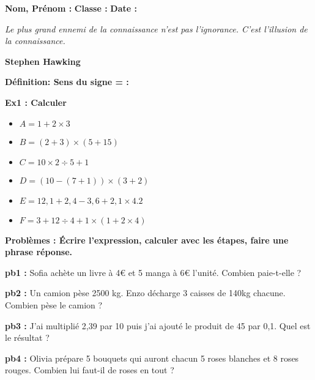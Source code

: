 



\textbf{Nom, Prénom :} \hspace{8cm} \textbf{Classe :} \hspace{3cm} \textbf{Date :}\\

\begin{center}
  \textit{Le plus grand ennemi de la connaissance n'est pas l'ignorance. C'est l'illusion de la connaissance.} 
  
  \textbf{Stephen Hawking}
\end{center}

\textbf{Définition: Sens du signe = :} \\ \Pointilles[1]

\textbf{Ex1 : Calculer}

\begin{multicols}{3}
\begin{itemize}[label={$\bullet$}]
  \item $A = 1 + 2 \times 3$ 
  \item $B = (2+3) \times (5+15)$
  \item $C = 10 \times 2 \div 5 + 1$
  \item $D = (10 - (7 + 1)) \times (3 + 2)$
  \item $E = 12,1 + 2,4 - 3,6 + 2,1 \times 4.2$
  \item $F = 3 + 12 \div 4 + 1 \times (1 + 2 \times 4)$
\end{itemize}
\end{multicols}

\Pointilles[20]

\textbf{Problèmes : Écrire l'expression, calculer avec les étapes, faire une phrase réponse.}

\begin{multicols}{2}

\textbf{pb1 : }
Sofia achète un livre à 4€ et 5 manga à 6€ l'unité. Combien paie-t-elle ?  \\ \Pointilles[5]

\textbf{pb2 : }
Un camion pèse 2500 kg. Enzo décharge 3 caisses de 140kg chacune. Combien pèse le camion ? \\ \Pointilles[5] \columnbreak

\textbf{pb3 : }
\og J'ai multiplié 2,39 par 10 puis j'ai ajouté le produit de 45 par 0,1. \fg 
Quel est le résultat ? \\ \Pointilles[5]

\textbf{pb4 : }
Olivia prépare 5 bouquets qui auront chacun 5 roses blanches et 8 roses rouges. Combien lui faut-il de roses en tout ? \\ \Pointilles[5]

\end{multicols}


